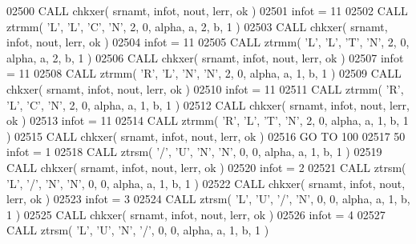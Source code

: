 \begin{DoxyCode}
02500       \textcolor{keyword}{CALL }chkxer( srnamt, infot, nout, lerr, ok )
02501       infot = 11
02502       \textcolor{keyword}{CALL }ztrmm( \textcolor{stringliteral}{'L'}, \textcolor{stringliteral}{'L'}, \textcolor{stringliteral}{'C'}, \textcolor{stringliteral}{'N'}, 2, 0, alpha, a, 2, b, 1 )
02503       \textcolor{keyword}{CALL }chkxer( srnamt, infot, nout, lerr, ok )
02504       infot = 11
02505       \textcolor{keyword}{CALL }ztrmm( \textcolor{stringliteral}{'L'}, \textcolor{stringliteral}{'L'}, \textcolor{stringliteral}{'T'}, \textcolor{stringliteral}{'N'}, 2, 0, alpha, a, 2, b, 1 )
02506       \textcolor{keyword}{CALL }chkxer( srnamt, infot, nout, lerr, ok )
02507       infot = 11
02508       \textcolor{keyword}{CALL }ztrmm( \textcolor{stringliteral}{'R'}, \textcolor{stringliteral}{'L'}, \textcolor{stringliteral}{'N'}, \textcolor{stringliteral}{'N'}, 2, 0, alpha, a, 1, b, 1 )
02509       \textcolor{keyword}{CALL }chkxer( srnamt, infot, nout, lerr, ok )
02510       infot = 11
02511       \textcolor{keyword}{CALL }ztrmm( \textcolor{stringliteral}{'R'}, \textcolor{stringliteral}{'L'}, \textcolor{stringliteral}{'C'}, \textcolor{stringliteral}{'N'}, 2, 0, alpha, a, 1, b, 1 )
02512       \textcolor{keyword}{CALL }chkxer( srnamt, infot, nout, lerr, ok )
02513       infot = 11
02514       \textcolor{keyword}{CALL }ztrmm( \textcolor{stringliteral}{'R'}, \textcolor{stringliteral}{'L'}, \textcolor{stringliteral}{'T'}, \textcolor{stringliteral}{'N'}, 2, 0, alpha, a, 1, b, 1 )
02515       \textcolor{keyword}{CALL }chkxer( srnamt, infot, nout, lerr, ok )
02516       \textcolor{keywordflow}{GO TO} 100
02517    50 infot = 1
02518       \textcolor{keyword}{CALL }ztrsm( \textcolor{stringliteral}{'/'}, \textcolor{stringliteral}{'U'}, \textcolor{stringliteral}{'N'}, \textcolor{stringliteral}{'N'}, 0, 0, alpha, a, 1, b, 1 )
02519       \textcolor{keyword}{CALL }chkxer( srnamt, infot, nout, lerr, ok )
02520       infot = 2
02521       \textcolor{keyword}{CALL }ztrsm( \textcolor{stringliteral}{'L'}, \textcolor{stringliteral}{'/'}, \textcolor{stringliteral}{'N'}, \textcolor{stringliteral}{'N'}, 0, 0, alpha, a, 1, b, 1 )
02522       \textcolor{keyword}{CALL }chkxer( srnamt, infot, nout, lerr, ok )
02523       infot = 3
02524       \textcolor{keyword}{CALL }ztrsm( \textcolor{stringliteral}{'L'}, \textcolor{stringliteral}{'U'}, \textcolor{stringliteral}{'/'}, \textcolor{stringliteral}{'N'}, 0, 0, alpha, a, 1, b, 1 )
02525       \textcolor{keyword}{CALL }chkxer( srnamt, infot, nout, lerr, ok )
02526       infot = 4
02527       \textcolor{keyword}{CALL }ztrsm( \textcolor{stringliteral}{'L'}, \textcolor{stringliteral}{'U'}, \textcolor{stringliteral}{'N'}, \textcolor{stringliteral}{'/'}, 0, 0, alpha, a, 1, b, 1 )

\end{DoxyCode}
